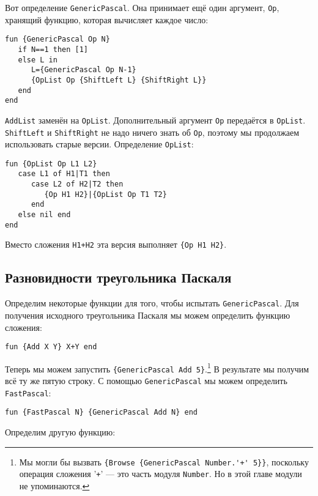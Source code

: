 Вот определение \lstinline|GenericPascal|. Она принимает ещё один аргумент, \lstinline|Op|, хранящий функцию, которая вычисляет каждое число:



\begin{lstlisting}
fun {GenericPascal Op N}
   if N==1 then [1]
   else L in
      L={GenericPascal Op N-1}
      {OpList Op {ShiftLeft L} {ShiftRight L}}
   end
end
\end{lstlisting}


\lstinline|AddList| заменён на \lstinline|OpList|. Дополнительный аргумент \lstinline|Op| передаётся в \lstinline|OpList|. \lstinline|ShiftLeft| и \lstinline|ShiftRight| не надо ничего знать об \lstinline|Op|, поэтому мы продолжаем использовать старые версии. Определение \lstinline|OpList|:

\begin{lstlisting}
fun {OpList Op L1 L2}
   case L1 of H1|T1 then
      case L2 of H2|T2 then
         {Op H1 H2}|{OpList Op T1 T2}
      end
   else nil end
end
\end{lstlisting}


Вместо сложения \lstinline|H1+H2| эта версия выполняет \lstinline|{Op H1 H2}|.

\subsection{Разновидности треугольника Паскаля}

Определим некоторые функции для того, чтобы испытать \lstinline|GenericPascal|. Для получения исходного треугольника Паскаля мы можем определить функцию сложения:

\begin{lstlisting}
fun {Add X Y} X+Y end
\end{lstlisting}

\VerbatimFootnotes
Теперь мы можем запустить \lstinline|{GenericPascal Add 5}|.\footnote{Мы могли бы вызвать \verb|{Browse {GenericPascal Number.'+' 5}}|, поскольку операция сложения  '\lstinline|+|' --- это часть модуля \lstinline|Number|. Но в этой главе модули не упоминаются.} В результате мы получим всё ту же пятую строку. С помощью \lstinline|GenericPascal| мы можем определить \lstinline|FastPascal|:

\begin{lstlisting}
fun {FastPascal N} {GenericPascal Add N} end
\end{lstlisting}

Определим другую функцию:

